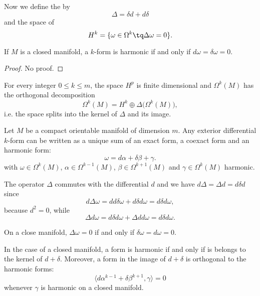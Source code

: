 Now we define the  by
\begin{equation}
	\Delta=\delta d+d\delta
\end{equation}
and the space of 
\begin{equation}
	H^k=\{ \omega\in\Omega^k\tq\Delta\omega=0 \}.
\end{equation}

\begin{lemma}
	If $M$ is a closed manifold, a $k$-form is harmonic if and only if $d\omega=\delta\omega=0$.
\end{lemma}

\begin{proof}
	No proof.
\end{proof}

\begin{theorem}
	For every integer $0\leq k\leq m$, the space $H^p$ is finite dimensional and $\Omega^k(M)$ has the orthogonal decomposition
	\begin{equation}
		\Omega^k(M)=H^k\oplus\Delta\big( \Omega^k(M) \big),
	\end{equation}
	i.e. the space splits into the kernel of $\Delta$ and its image.
\end{theorem}

\begin{theorem}
	Let $M$ be a compact orientable manifold of dimension $m$. Any exterior differential $k$-form can be written as a unique sum of an exact form, a coexact form and an harmonic form:
	\begin{equation}
		\omega=d\alpha+\delta\beta+\gamma.
	\end{equation}
	with $\omega\in\Omega^k(M)$, $\alpha\in\Omega^{k-1}(M)$, $\beta\in\Omega^{k+1}(M)$ and $\gamma\in\Omega^k(M)$ harmonic.
\end{theorem}

The operator $\Delta$ commutes with the differential $d$ and we have $d\Delta=\Delta d= d\delta d$ since
\begin{equation}
	d\Delta \omega=dd\delta\omega+d\delta d\omega=d\delta d\omega,
\end{equation}
because $d^2=0$, while
\begin{equation}
	\Delta d\omega=d\delta d\omega+\Delta d d\omega=d\delta d\omega.
\end{equation}

\begin{lemma}
	On a close manifold, $\Delta\omega=0$ if and only if $\delta\omega=d\omega=0$.
\end{lemma}

In the case of a closed manifold, a form is harmonic if and only if is belongs to the kernel of $d+\delta$. Moreover, a form in the image of $d+\delta$ is orthogonal to the harmonic forms:
\begin{equation}
	\langle d\alpha^{k-1}+\delta\beta^{k+1}, \gamma\rangle =0
\end{equation}
whenever $\gamma$ is harmonic on a closed manifold.
